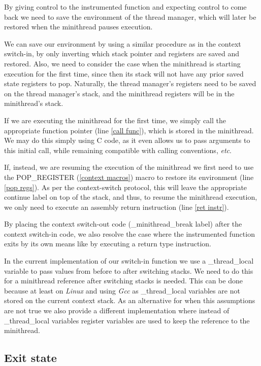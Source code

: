 \documentclass[12pt,a4paper]{report}
\begin{document}
By giving control to the instrumented function and expecting control to come back we need to save the environment of the thread manager, which will later be restored when the minithread pauses execution.  

We can save our environment by using a similar procedure as in the context switch-in, by only inverting which stack pointer and registers are saved and restored. Also, we need to consider the case when the minithread is starting execution for the first time, since then its stack will not have any prior saved state registers to pop. Naturally, the thread manager's registers need to be saved on the thread manager's stack, and the minithread registers will be in the minithread's stack.

If we are executing the minithread for the first time, we simply call the appropriate function pointer (line \ref{call func}), which is stored in the minithread. We may do this simply using C code, as it even allows us to pass arguments to this initial call, while remaining compatible with calling conventions, \textit{etc}. 

If, instead, we are resuming the execution of the minithread we first need to use the POP\_REGISTER (\ref{context macros}) macro to restore its environment (line \ref{pop regs}). As per the context-switch protocol, this will leave the appropriate continue label on top of the stack, and thus, to resume the minithread execution, we only need to execute an assembly return instruction (line \ref{ret instr}).

By placing the context switch-out code (\_minithread\_break label) after the context switch-in code, we also resolve the case where the instrumented function exits by its own means like by executing a return type instruction.

In the current implementation of our switch-in function we use a \_thread\_local variable to pass values from before to after switching stacks. We need to do this for a minithread reference after switching stacks is needed. This can be done because at least on \textit{Linux} and using \textit{Gcc} as \_thread\_local variables are not stored on the current context stack. As an alternative for when this assumptions are not true we also provide a different implementation where instead of \_thread\_local variables register variables are used to keep the reference to the minithread.

\subsection{Exit state} \label{exit state}
\end{document}
